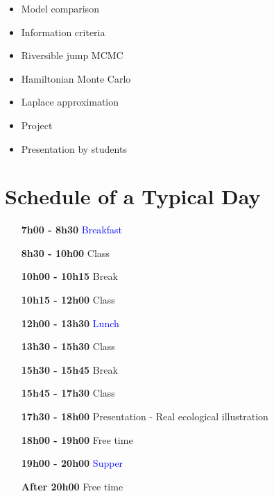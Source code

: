 \documentclass[12]{article}
\begin{document}
    \begin{itemize}[leftmargin=2.5cm]
      \item Model comparison
      \item Information criteria
      \item Riversible jump MCMC
      \item Hamiltonian Monte Carlo
      \item Laplace approximation
      \item Project
      \item Presentation by students
    \end{itemize}

    \section*{Schedule of a Typical Day}

    \begin{itemize}[leftmargin=2.5cm]
      \item[\bf 7h00 - 8h30] \textcolor{blue}{Breakfast}
      \item[\bf 8h30 - 10h00] Class
      \item[\bf 10h00 - 10h15] \textcolor{green!50!black}{Break}
      \item[\bf 10h15 - 12h00] Class
      \item[\bf 12h00 - 13h30] \textcolor{blue}{Lunch}
      \item[\bf 13h30 - 15h30] Class
      \item[\bf 15h30 - 15h45] \textcolor{green!50!black}{Break}
      \item[\bf 15h45 - 17h30] Class
      \item[\bf 17h30 - 18h00] Presentation - Real ecological illustration
      \item[\bf 18h00 - 19h00] \textcolor{green!50!black}{Free time}
      \item[\bf 19h00 - 20h00] \textcolor{blue}{Supper}
      \item[\bf After 20h00] \textcolor{green!50!black}{Free time}
    \end{itemize}
\end{document}
